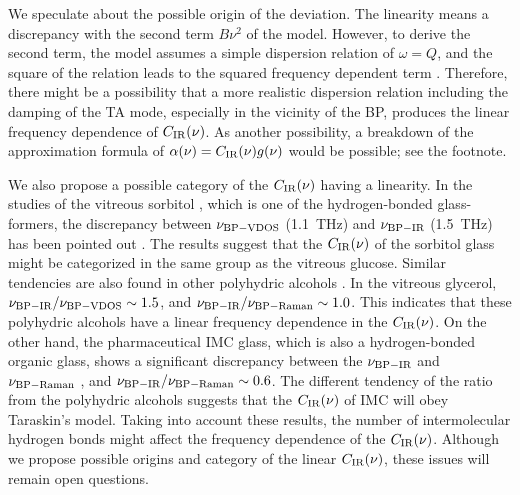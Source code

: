 \documentclass[%
 reprint,
superscriptaddress,
 amsmath,amssymb,
 aps,
prb,
]{revtex4-1}
\begin{document}
We speculate about the possible origin of the deviation.
The linearity means a discrepancy with the second term $B\nu^{2}$ of the model.
However, to derive the second term, the model assumes a simple dispersion relation of  $\omega = Q$, and the square of the relation leads to the squared frequency dependent term \cite{Taraskin2006}.
Therefore, there might be a possibility that a more realistic dispersion relation including the damping of the TA mode, especially in the vicinity of the BP,  produces the linear frequency dependence of $C_{\rm IR}(\nu)$.
As another possibility, a breakdown of the approximation formula of $\alpha(\nu) = C_{\rm IR}(\nu)g(\nu)$ would be possible; see the footnote\cite{footnote1}.

We also propose a possible category of the $C_{\rm IR}(\nu)$ having a linearity.
In the studies of the vitreous sorbitol \cite{Ruta2012, Sibik2016},  which is one of the hydrogen-bonded glass-formers, the discrepancy between $\nu_{\rm BP-VDOS}$ (1.1~THz) \cite{Ruta2012} and $\nu_{\rm BP-IR}$ (1.5~THz) \cite{Sibik2016} has been pointed out \cite{Sibik2016}.
The results suggest that the  $C_{\rm IR}(\nu)$ of the sorbitol glass might be categorized in the same group as the vitreous glucose.
Similar tendencies are also found in other polyhydric alcohols \cite{Sibik2014, Kojima1993, Yamamuro2000}.
In the vitreous glycerol\cite{Sibik2014, Kojima1993, Yamamuro2000}, $\nu_{\rm BP-IR}/\nu_{\rm BP-VDOS} \sim 1.5$, and $\nu_{\rm BP-IR}/\nu_{\rm BP-Raman} \sim 1.0$.
This indicates that these polyhydric alcohols \cite{Sibik2014} have a linear frequency dependence in the $C_{\rm IR}(\nu)$.
On the other hand, the pharmaceutical IMC glass, which is also a hydrogen-bonded organic glass, shows a significant discrepancy between the  $\nu_{\rm BP-IR}$\cite{Shibata2015, Kojima2015} and $\nu_{\rm BP-Raman}$ \cite{Shibata2015, Kojima2015, Hedoux2009}, and $\nu_{\rm BP-IR}/\nu_{\rm BP-Raman} \sim 0.6$\cite{Shibata2015, Kojima2015, Hedoux2009}.
The different tendency of the ratio from the polyhydric alcohols suggests that the $C_{\rm IR}(\nu)$ of IMC will obey Taraskin's model.
Taking into account these results, the number of intermolecular hydrogen bonds might affect the frequency dependence of the $C_{\rm IR}(\nu)$.
Although we propose possible origins and category of the linear $C_{\rm IR}(\nu)$, these issues will remain open questions.
\end{document}
